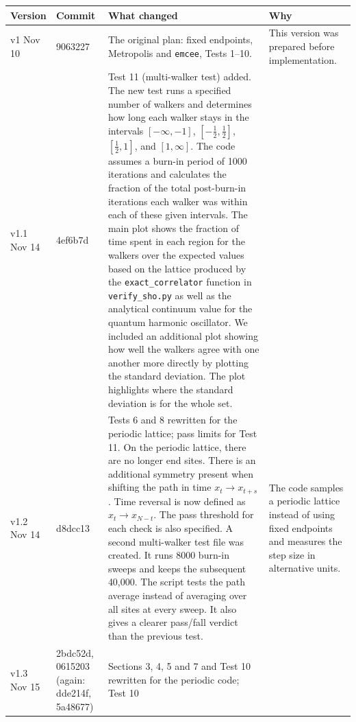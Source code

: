 \documentclass[11pt]{article}
\begin{document}
\begin{table}[htbp]
\centering
\footnotesize
\setlength{\tabcolsep}{3pt}
\begin{tabular}{p{1.1cm}p{1.7cm}p{7.8cm}p{3.8cm}}
\toprule
Version & Commit & What changed & Why\\
\midrule
v1 \newline Nov 10 & 9063227 &
The original plan: fixed endpoints, Metropolis and \texttt{emcee}, Tests 1--10. &
This version was prepared before implementation.\\[2pt]
v1.1 \newline Nov 14 & 4ef6b7d &
Test 11 (multi-walker test) added. The new test runs a specified number of
walkers and determines how long each walker stays in the intervals
$[-\infty, -1]$, $[-\frac12,\frac12]$, $[\frac12, 1]$, and $[1, \infty]$.
The code assumes a burn-in period of 1000 iterations and calculates the
fraction of the total post-burn-in iterations each walker was within each of
these given intervals. The main plot shows the fraction of time spent in each
region for the walkers over the expected values based on the lattice produced
by the \texttt{exact\_correlator} function in \texttt{verify\_sho.py} as well
as the analytical continuum value for the quantum harmonic oscillator. We
included an additional plot showing how well the walkers agree with one
another more directly by plotting the standard deviation. The plot highlights
where the standard deviation is for the whole set. &
\\[2pt]
v1.2 \newline Nov 14 & d8dcc13 &
Tests 6 and 8 rewritten for the periodic lattice; pass limits for Test 11.
On the periodic lattice, there are no longer end sites. There is an additional
symmetry present when shifting the path in time $x_t\to x_{t+s}$. Time
reversal is now defined as $x_t \to x_{N-t}$. The pass threshold for each check
is also specified. A second multi-walker test file was created. It runs 8000
burn-in sweeps and keeps the subsequent 40,000. The script tests the path
average instead of averaging over all sites at every sweep. It also gives a
clearer pass/fall verdict than the previous test. &
The code samples a periodic lattice instead of using fixed endpoints and
measures the step size in alternative units.\\[2pt]
v1.3 \newline Nov 15 & 2bdc52d, 0615203 \newline (again: dde214f, 5a48677) &
Sections 3, 4, 5 and 7 and Test 10 rewritten for the periodic code; Test 10

\end{tabular}
\end{table}
\end{document}
